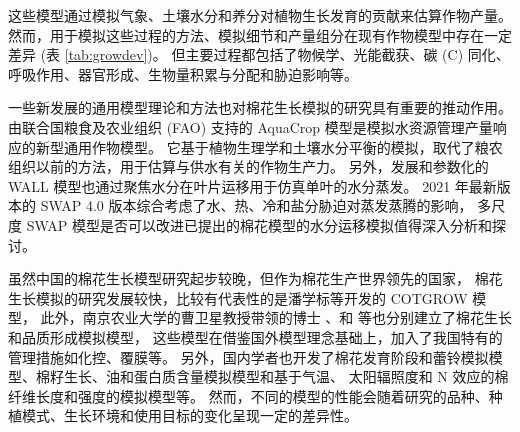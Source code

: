这些模型通过模拟气象、土壤水分和养分对植物生长发育的贡献来估算作物产量。
然而，用于模拟这些过程的方法、模拟细节和产量组分在现有作物模型中存在一定差异 (表 \ref{tab:growdev})\cite{thorp2014}。
但主要过程都包括了物候学、光能截获、碳 (C) 同化、呼吸作用、器官形成、生物量积累与分配和胁迫影响等。

一些新发展的通用模型理论和方法也对棉花生长模拟的研究具有重要的推动作用。
由联合国粮食及农业组织 (FAO) 支持的 AquaCrop 模型是模拟水资源管理产量响应的新型通用作物模型\cite{tan2018}。
它基于植物生理学和土壤水分平衡的模拟，取代了粮农组织以前的方法，用于估算与供水有关的作物生产力。
另外，发展和参数化的 WALL 模型也通过聚焦水分在叶片运移用于仿真单叶的水分蒸发\cite{pachepsky2009}。
2021 年最新版本的 SWAP 4.0 版本\cite{swap2021}综合考虑了水、热、冷和盐分胁迫对蒸发蒸腾的影响，%
多尺度 SWAP 模型是否可以改进已提出的棉花模型的水分运移模拟值得深入分析和探讨。

虽然中国的棉花生长模型研究起步较晚，但作为棉花生产世界领先的国家，
棉花生长模拟的研究发展较快，比较有代表性的是潘学标等开发的 COTGROW\cite{pan1996} 模型，%
此外，南京农业大学的曹卫星教授带领的博士 、和 等也分别建立了棉花生长和品质形成模拟模型，%
这些模型在借鉴国外模型理念基础上，加入了我国特有的管理措施如化控、覆膜等。
另外，国内学者也开发了棉花发育阶段和蕾铃模拟模型\cite{ma2005}、棉籽生长、油和蛋白质含量模拟模型\cite{li2009}和基于气温、%
太阳辐照度和 N 效应的棉纤维长度和强度的模拟模型\cite{zhao2012}等。
然而，不同的模型的性能会随着研究的品种、种植模式、生长环境和使用目标的变化呈现一定的差异性。

